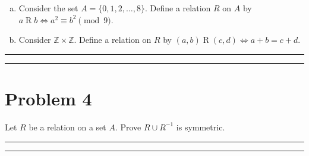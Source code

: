 \documentclass{article}
\theoremstyle{definition}
\newenvironment{solution}{\bigskip\hrule{\hfill}}{\bigskip\hrule{\hfill}} %
\begin{document}
\begin{enumerate}[a)] %
    \item Consider the set $A=\{0,1,2,\dots,8\}$. Define a relation $R$ on $A$ by $a\mathrel{R}b\Longleftrightarrow a^2\equiv b^2\pmod{9}$.
    \item Consider $\mathbb{Z}\times\mathbb{Z}$. Define a relation on $R$ by $\left(a,b\right)\mathrel{R}\left(c,d\right)\Longleftrightarrow a+b=c+d$.
\end{enumerate}
\begin{solution}


\end{solution}


\newpage


\section*{Problem 4}
Let $R$ be a relation on a set $A$. Prove $R\cup R^{-1}$ is symmetric.
\begin{solution}


\end{solution}


\newpage

\end{document}
